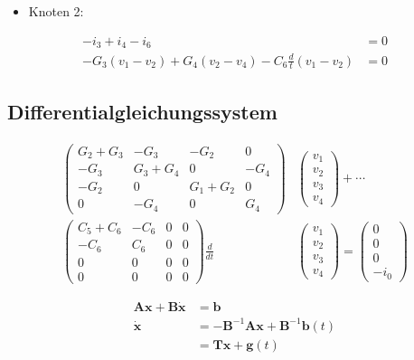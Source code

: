 \documentclass[
  ngerman,
  letterpaper,
]{scrbook}
\providecommand{\tightlist}{%
  \setlength{\itemsep}{0pt}\setlength{\parskip}{0pt}}
\begin{document}
\begin{itemize}
\tightlist
\item
  Knoten 2:
\end{itemize}

\begin{align}
-i_3+i_4-i_6 &= 0 \\
-G_3(v_1-v_2)+G_4(v_2-v_4)-C_6 \frac{d}{t}(v_1-v_2) &= 0
\end{align}

\subsection{Differentialgleichungssystem}\label{differentialgleichungssystem}

\begin{align}
\begin{pmatrix}
G_2+G_3 & -G_3 & -G_2 & 0 \\
-G_3 & G_3+G_4 & 0 & -G_4 \\
-G_2 & 0 & G_1+G_2 & 0 \\
0 & -G_4 & 0 & G_4
\end{pmatrix} & 
\begin{pmatrix}
v_1 \\
v_2 \\
v_3 \\
v_4
\end{pmatrix}
+ \cdots \\ 
\begin{pmatrix}
C_5+C_6 & -C_6 & 0 & 0 \\
-C_6 & C_6 & 0 & 0 \\
0 & 0 & 0 & 0 \\
0 & 0 & 0 & 0
\end{pmatrix}
\frac{d}{dt} &
\begin{pmatrix}
v_1 \\
v_2 \\
v_3 \\
v_4
\end{pmatrix}
=
\begin{pmatrix}
0 \\
0 \\
0 \\
-i_0
\end{pmatrix}
\end{align}

\begin{align}
\mathbf{A} \mathbf{x} + \mathbf{B} \dot{\mathbf{x}} &= \mathbf{b} \\
\dot{\mathbf{x}} &= -\mathbf{B}^{-1}\mathbf{A}\mathbf{x} +
\mathbf{B}^{-1}\mathbf{b}(t) \\
&= \mathbf{T}\mathbf{x} + \mathbf{g}(t)
\end{align}
\end{document}
